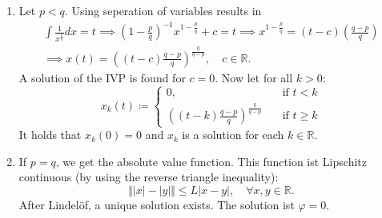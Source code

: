 \documentclass{article}
\theoremstyle{named}
\begin{document}
\begin{enumerate}[label=(\roman*)]
		
		\item Let $p < q$. Using seperation of variables results in
		\begin{gather*}
		\int \frac{1}{x^{\frac{p}{q}}}dx = t \implies (1-\frac{p}{q})^{-1}x^{1-\frac{p}{q}} + c = t \implies x^{1-\frac{p}{q}} = (t-c)(\frac{q-p}{q}) \\ \implies x(t) = ((t-c)\frac{q-p}{q})^{\frac{q}{q-p}}, \quad c \in \mathbb R.
		\end{gather*}
		A solution of the IVP is found for $c=0$.  Now let for all $k>0$:
		\[
		x_k(t) \coloneqq \begin{cases}0, \quad &\text{if $t < k$} \\
		\left((t-k)\frac{q-p}{q} \right)^{\frac{q}{q-p}}\quad &\text{if $t \geq k$} 
		\end{cases}
		\]
		It holds that $x_k(0)=0$ and $x_k$ is a solution for each $k \in \mathbb R$.
		
		\item If $p=q$, we get the absolute value function. This function ist Lipschitz continuous (by using the reverse triangle inequality):
		\[
		\Vert |x| - |y| \Vert \leq L |x-y|, \quad \forall x,y \in \mathbb R.
		\]
		After Lindelöf, a unique solution exists. The solution ist $\varphi = 0.$
	\end{enumerate}
	
\end{document}
